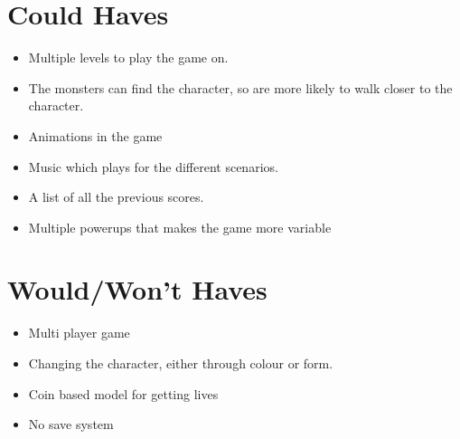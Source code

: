 \section{Could Haves}

\begin{itemize}
\itemsep0em 
  \item Multiple levels to play the game on.
  \item The monsters can find the character, so are more likely to walk closer to the character.
  \item Animations in the game
  \item Music which plays for the different scenarios.  
  \item A list of all the previous scores.
  \item Multiple powerups that makes the game more variable
\end{itemize}

\section{Would/Won't Haves}
\begin{itemize}
\itemsep0em 
	\item Multi player game
	\item Changing the character, either through colour or form.
	\item Coin based model for getting lives
	\item No save system
\end{itemize}
